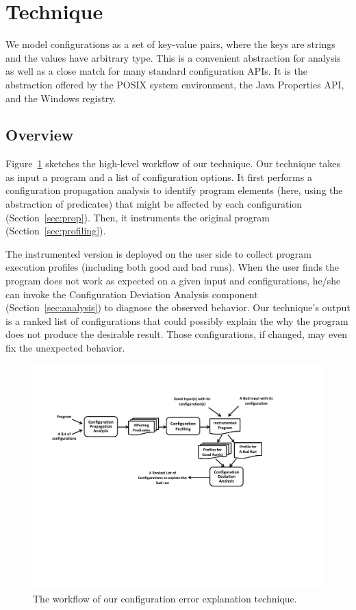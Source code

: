 \section{Technique}
\label{sec:technique}

We model configurations as a set of key-value pairs, where
the keys are strings and the values have arbitrary type. This is a
convenient abstraction for analysis as well as a close match for
many standard configuration APIs. It is the abstraction offered
by the POSIX system environment, the Java Properties API,
and the Windows registry.


\subsection{Overview}

Figure~\ref{fig:workflow} sketches the high-level workflow of our technique.
Our technique takes as input a program and a list of configuration options.
It first performs a configuration propagation analysis to identify
program elements (here, using the abstraction of predicates) that might be
affected by each configuration (Section~\ref{sec:prop}). Then, it
instruments the original program (Section~\ref{sec:profiling}).

The instrumented version is deployed on the user side to collect program execution
profiles (including both good and bad runs). When the user finds the program
does not work as expected on a given input and configurations,
he/she can invoke the Configuration Deviation Analysis component (Section~\ref{sec:analysis}) to
diagnose the observed behavior. Our technique's output is a ranked list of
configurations that could possibly explain the why the program does not produce the desirable result. Those
configurations, if changed, may even fix the unexpected behavior.

\begin{figure}[!]
  \centering
  \includegraphics[scale=0.750]{workflow}
  \vspace*{-2.0ex}\caption {{\label{fig:workflow} The workflow of our configuration error explanation technique.
}}
\end{figure}

